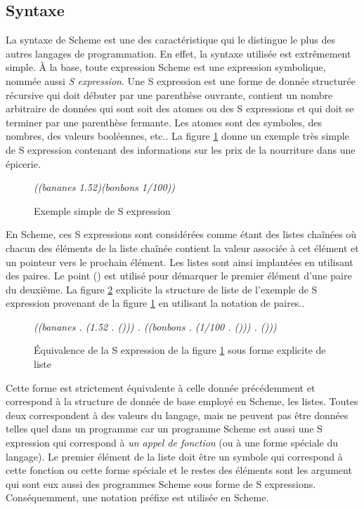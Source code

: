 \documentclass[12pt,oneside,letterpaper,francais]{book}
\newcommand{\scheme}[1]{\selectlanguage{english}{\tt #1}\selectlanguage{french}}
\newcommand{\schemeresult}[1]{{\it #1}}
\begin{document}
\subsection{Syntaxe}
La syntaxe de Scheme est une des caractéristique qui le distingue le
plus des autres langages de programmation. En effet, la syntaxe
utilisée est extrêmement simple. À la base, toute expression Scheme
est une expression symbolique, nommée aussi \textit{S expression}. Une
S expression est une forme de donnée structurée récursive qui doit
débuter par une parenthèse ouvrante, contient un nombre arbitraire de
données qui sont soit des atomes ou des S expressions et qui doit se
terminer par une parenthèse fermante. Les atomes sont des symboles,
des nombres, des valeurs booléennes, etc.. La figure \ref{FIG:sexp}
donne un exemple très simple de S expression contenant des
informations sur les prix de la nourriture dans une épicerie.\\

\begin{figure}[htb!]
  \schemeresult{((bananes 1.52)(bonbons 1/100))}
  \caption{Exemple simple de S expression}
  \label{FIG:sexp}
\end{figure}

En Scheme, ces S expressions sont considérées comme étant des listes
chaînées où chacun des éléments de la liste chaînée contient la valeur
associée à cet élément et un pointeur vers le prochain élément. Les
listes sont ainsi implantées en utilisant des paires. Le point
(\scheme{.}) est utilisé pour démarquer le premier élément d'une paire
du deuxième. La figure \ref{FIG:sexp->list} explicite la structure de
liste de l'exemple de S expression provenant de la figure
\ref{FIG:sexp} en utilisant la notation de paires..\\


\begin{figure}[htb!]
{{\it
    ((bananes . (1.52 . ())) . ((bonbons . (1/100 . ())) . ()))
    }}
  \caption{Équivalence de la S expression de la figure \ref{FIG:sexp}
    sous forme explicite de liste}
  \label{FIG:sexp->list}
\end{figure}

Cette forme est strictement équivalente à celle donnée précédemment et
correspond à la structure de donnée de base employé en Scheme, les
listes. Toutes deux correspondent à des valeurs du langage, mais ne
peuvent pas être données telles quel dans un programme car un
programme Scheme est aussi une S expression qui correspond à \emph{un
  appel de fonction} (ou à une forme spéciale du langage). Le premier
élément de la liste doit être un symbole qui correspond à cette
fonction ou cette forme spéciale et le restes des éléments sont les
argument qui sont eux aussi des programmes Scheme sous forme de S
expressions. Conséquemment, une notation préfixe est utilisée en
Scheme.
\end{document}
